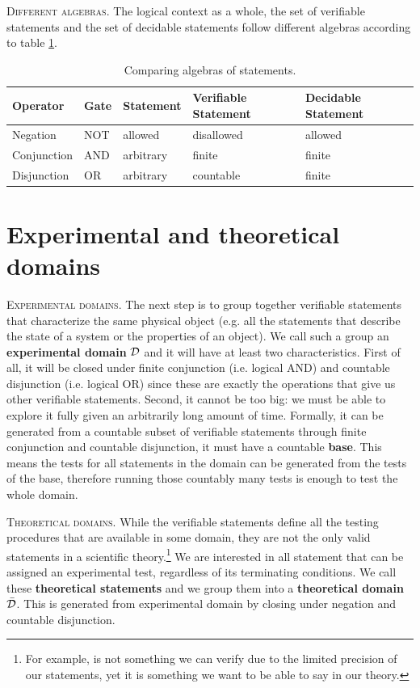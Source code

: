 \documentclass[10pt,twocolumn, nofootinbib]{revtex4-1}
\newcommand\partitle[1]{\textsc{#1}.}
\begin{document}
\partitle{Different algebras} The logical context as a whole, the set of verifiable statements and the set of decidable statements follow different algebras according to table \ref{algebras}.

\begin{table}[h]
	\centering
	\begin{tabular}{p{} p{} p{} p{} p{}}
		Operator & Gate & Statement & Verifiable Statement & Decidable Statement  \\ 
		\hline 
		Negation & NOT & allowed & disallowed & allowed \\ 
		Conjunction & AND & arbitrary  & finite & finite \\ 
		Disjunction & OR & arbitrary  & countable & finite \\ 
	\end{tabular}
	\caption{Comparing algebras of statements.}
	\label{algebras}
\end{table}


\section{Experimental and theoretical domains}

\partitle{Experimental domains} The next step is to group together verifiable statements that characterize the same physical object (e.g. all the statements that describe the state of a system or the properties of an object). We call such a group an \textbf{experimental domain} $\mathcal{D}$ and it will have at least two characteristics. First of all, it will be closed under finite conjunction (i.e. logical AND) and countable disjunction (i.e. logical OR) since these are exactly the operations that give us other verifiable statements. Second, it cannot be too big: we must be able to explore it fully given an arbitrarily long amount of time. Formally, it can be generated from a countable subset of verifiable statements through finite conjunction and countable disjunction, it must have a countable \textbf{base}. This means the tests for all statements in the domain can be generated from the tests of the base, therefore running those countably many tests is enough to test the whole domain.

\partitle{Theoretical domains} While the verifiable statements define all the testing procedures that are available in some domain, they are not the only valid statements in a scientific theory.\footnote{For example,  is not something we can verify due to the limited precision of our statements, yet it is something we want to be able to say in our theory.} We are interested in all statement that can be assigned an experimental test, regardless of its terminating conditions. We call these \textbf{theoretical statements} and we group them into a \textbf{theoretical domain} $\bar{\mathcal{D}}$. This is generated from experimental domain by closing under negation and countable disjunction.
\end{document}
